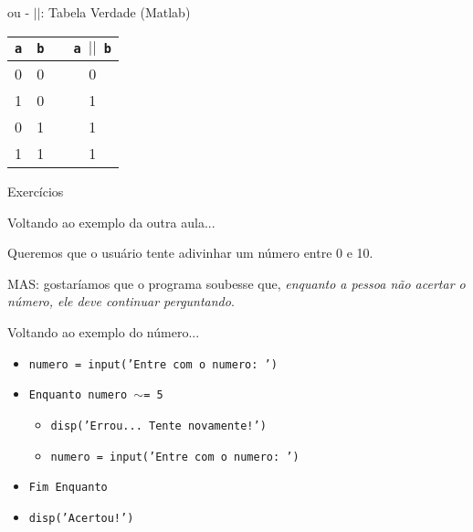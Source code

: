 \documentclass[hyperref={pdfpagelabels=false}]{beamer}
\begin{document}
\begin{frame}{ou - {\texttt{$||$}}: Tabela Verdade (Matlab)}
  \begin{center}
    \begin{tabular}{c c c c}
      \texttt{a} & \texttt{b} & & \texttt{a $||$ b}\\\toprule
      0 & 0 & & 0\\\midrule
      1 & 0 & &1\\\midrule
      0 & 1 & &1\\\midrule
      1 & 1 & &1\\\bottomrule
    \end{tabular}
  \end{center}
\end{frame}

\begin{frame}{Exercícios}
\end{frame}

\begin{frame}{Voltando ao exemplo da outra aula...}

   Queremos que o usuário tente adivinhar um número entre 0 e 10.

   MAS: gostaríamos que o programa soubesse que, \emph{enquanto a pessoa não acertar o número, ele deve continuar perguntando}.
\end{frame}

\begin{frame}{Voltando ao exemplo do número...}
  \begin{itemize}
  \item[] {\texttt{numero = input('Entre com o numero: ')}}
  \item[] {\texttt{\alert{Enquanto} numero $\sim$= 5}}
    \begin{itemize}
    \item[] {\texttt{disp('Errou... Tente novamente!')}}
    \item[] {\texttt{numero = input('Entre com o numero: ')}}
    \end{itemize}
  \item[] {\texttt{\alert{Fim Enquanto}}}
  \item[] {\texttt{disp('Acertou!')}}
  \end{itemize}
\end{frame}
\end{document}
